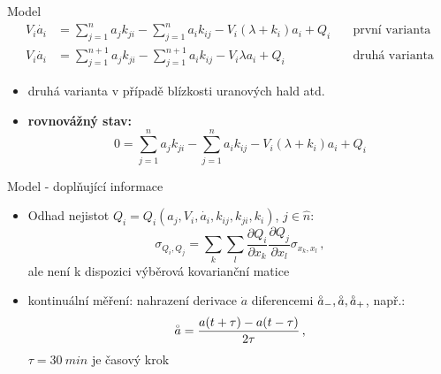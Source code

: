 \documentclass[10pt]{beamer}
\begin{document}
\begin{frame}{Model}
    \small
    \begin{align}
        V_i\dot{a_i}&=\sum^n_{j=1}a_j k_{ji}-\sum^n_{j=1}a_i k_{ij}-V_i(\lambda+k_i)a_i+Q_i\quad&\text{první varianta}\\
        V_i\dot{a_i}&=\sum^{n+1}_{j=1}a_j k_{ji}-\sum^{n+1}_{j=1}a_i k_{ij}-V_i\lambda a_i+Q_i\quad&\text{druhá varianta}
        \label{eq:rovnice}
    \end{align}
    \begin{itemize}
        \item druhá varianta v případě blízkosti uranových hald atd.
        \item \textbf{rovnovážný stav:}
            \begin{equation}
                0=\sum^n_{j=1}a_j k_{ji}-\sum^n_{j=1}a_i k_{ij}-V_i(\lambda+k_i)a_i+Q_i
            \end{equation}
    \end{itemize}
\end{frame}

\begin{frame}{Model - doplňující informace}
    \small
    \begin{itemize}
        \item Odhad nejistot $Q_i=Q_i(a_j, V_i, \dot{a_i}, k_{ij}, k_{ji}, k_i)$, $j\in\hat{n}$:
            \begin{equation}
                \sigma_{Q_i,Q_j}=\sum_k\sum_l\frac{\partial Q_i}{\partial x_k}\frac{\partial Q_j}{\partial x_l}\sigma_{x_k,x_l}\,,
                \label{eq:cov_matrix}
            \end{equation}
            ale není k dispozici výběrová kovarianční matice
        \item kontinuální měření: nahrazení derivace $\dot{a}$ diferencemi $\accentset{\circ}{a}_-, \accentset{\circ}{a}, \accentset{\circ}{a}_+$, např.:
            \begin{equation}
                \accentset{\circ}{a}=\frac{a(t+\tau)-a(t-\tau)}{2\tau}\,,
                \label{eq:centralni_diference}
            \end{equation}
            $\tau=\SI{30}{min}$ je časový krok
    \end{itemize}
\end{frame}
\end{document}
